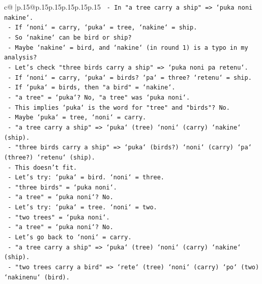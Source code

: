 \documentclass{article}
\begin{document}
{\begin{supertabular}{c@{$\;$}|p{.15\linewidth}@{}p{.15\linewidth}p{.15\linewidth}p{.15\linewidth}p{.15\linewidth}p{.15\linewidth}}
{{{\texttt{                  {-} In "a tree carry a ship" => `puka noni nakine`.} \\
\texttt{                    {-} If `noni` = carry, `puka` = tree, `nakine` = ship.} \\
\texttt{                  {-} So `nakine` can be bird or ship?} \\
\texttt{                  {-} Maybe `nakine` = bird, and `nakine` (in round 1) is a typo in my analysis?} \\
\texttt{                  {-} Let's check "three birds carry a ship" => `puka noni pa retenu`.} \\
\texttt{                    {-} If `noni` = carry, `puka` = birds? `pa` = three? `retenu` = ship.} \\
\texttt{                    {-} If `puka` = birds, then "a bird" = `nakine`.} \\
\texttt{                    {-} "a tree" = `puka`? No, "a tree" was `puka noni`.} \\
\texttt{                    {-} This implies `puka` is the word for "tree" and "birds"? No.} \\
\texttt{                    {-} Maybe `puka` = tree, `noni` = carry.} \\
\texttt{                    {-} "a tree carry a ship" => `puka` (tree) `noni` (carry) `nakine` (ship).} \\
\texttt{                    {-} "three birds carry a ship" => `puka` (birds?) `noni` (carry) `pa` (three?) `retenu` (ship).} \\
\texttt{                    {-} This doesn't fit.} \\
\texttt{                  {-} Let's try: `puka` = bird. `noni` = three.} \\
\texttt{                    {-} "three birds" = `puka noni`.} \\
\texttt{                    {-} "a tree" = `puka noni`? No.} \\
\texttt{                  {-} Let's try: `puka` = tree. `noni` = two.} \\
\texttt{                    {-} "two trees" = `puka noni`.} \\
\texttt{                    {-} "a tree" = `puka noni`? No.} \\
\texttt{                  {-} Let's go back to `noni` = carry.} \\
\texttt{                    {-} "a tree carry a ship" => `puka` (tree) `noni` (carry) `nakine` (ship).} \\
\texttt{                    {-} "two trees carry a bird" => `rete` (tree) `noni` (carry) `po` (two) `nakinenu` (bird).} \\
}}}
\end{supertabular}}
\end{document}
